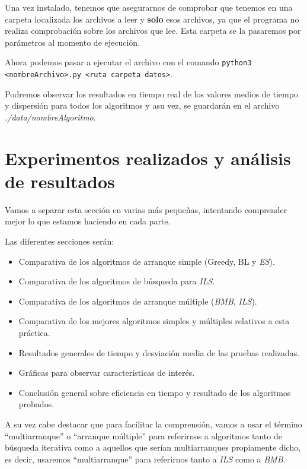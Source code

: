 Una vez instalado, tenemos que asegurarnos de comprobar que tenemos en una carpeta localizada los archivos a leer y \textbf{solo} esos archivos, ya que el programa no realiza comprobación sobre los archivos que lee. Esta carpeta se la pasaremos por parámetros al momento de ejecución.

Ahora podemos pasar a ejecutar el archivo con el comando \texttt{python3 <nombreArchivo>.py <ruta carpeta datos>}.

Podremos observar los resultados en tiempo real de los valores medios de tiempo y dispersión para todos los algoritmos y asu vez, se guardarán en el archivo \textit{./data/nombreAlgoritmo}.

\newpage

\section{Experimentos realizados y análisis de resultados}


Vamos a separar esta sección en varias más pequeñas, intentando comprender mejor lo que estamos haciendo en cada parte.

Las diferentes secciones serán:

\begin{itemize}
\item Comparativa de los algoritmos de arranque simple (Greedy, BL y \textit{ES}).
\item Comparativa de los algoritmos de búsqueda para \textit{ILS}.
\item Comparativa de los algoritmos de arranque múltiple (\textit{BMB}, \textit{ILS}).
\item Comparativa de los mejores algoritmos simples y múltiples relativos a esta práctica.
\item Resultados generales de tiempo y desviación media de las pruebas realizadas.
\item Gráficas para observar características de interés.
\item Conclusión general sobre eficiencia en tiempo y resultado de los algoritmos probados.
\end{itemize}

A su vez cabe destacar que para facilitar la comprensión, vamos a usar el término ``multiarranque'' o ``arranque múltiple'' para referirnos a algoritmos tanto de búsqueda iterativa como a aquellos que serían multiarranques propiamente dicho, es decir, usaremos ``multiarranque'' para referirnos tanto a \textit{ILS} como a \textit{BMB}.

